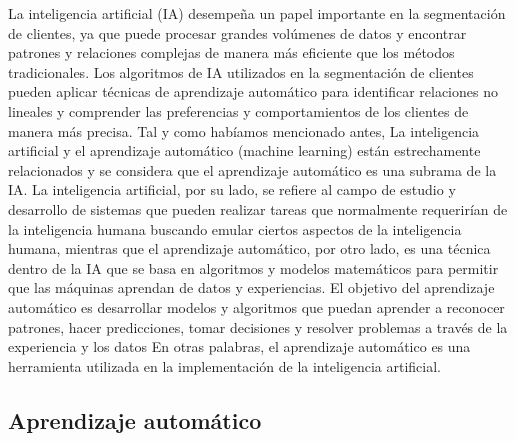 \documentclass[
  letterpaper,
  DIV=11,
  numbers=noendperiod]{scrreprt}
\begin{document}
La inteligencia artificial (IA) desempeña un papel importante en la
segmentación de clientes, ya que puede procesar grandes volúmenes de
datos y encontrar patrones y relaciones complejas de manera más
eficiente que los métodos tradicionales. Los algoritmos de IA utilizados
en la segmentación de clientes pueden aplicar técnicas de aprendizaje
automático para identificar relaciones no lineales y comprender las
preferencias y comportamientos de los clientes de manera más precisa.
Tal y como habíamos mencionado antes, La inteligencia artificial y el
aprendizaje automático (machine learning) están estrechamente
relacionados y se considera que el aprendizaje automático es una subrama
de la IA. La inteligencia artificial, por su lado, se refiere al campo
de estudio y desarrollo de sistemas que pueden realizar tareas que
normalmente requerirían de la inteligencia humana buscando emular
ciertos aspectos de la inteligencia humana, mientras que el aprendizaje
automático, por otro lado, es una técnica dentro de la IA que se basa en
algoritmos y modelos matemáticos para permitir que las máquinas aprendan
de datos y experiencias. El objetivo del aprendizaje automático es
desarrollar modelos y algoritmos que puedan aprender a reconocer
patrones, hacer predicciones, tomar decisiones y resolver problemas a
través de la experiencia y los datos En otras palabras, el aprendizaje
automático es una herramienta utilizada en la implementación de la
inteligencia artificial.

\hypertarget{aprendizaje-automuxe1tico}{%
\subsection{Aprendizaje automático}\label{aprendizaje-automuxe1tico}}
\end{document}
